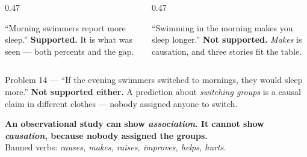 \documentclass[aspectratio=169, 11pt]{beamer}
\newcommand{\redink}[1]{{\color{redacc}\bfseries #1}}
\begin{document}
\begin{frame}[t, plain]
  \vspace{4pt}
  \begin{columns}[t]
    \begin{column}{0.47\textwidth}
      \begin{block}{``Morning swimmers report more sleep.''}
        \redink{Supported.} It is what was seen --- both percents and the gap.
      \end{block}
    \end{column}
    \begin{column}{0.47\textwidth}
      \begin{block}{``Swimming in the morning makes you sleep longer.''}
        \redink{Not supported.} \emph{Makes} is causation, and three stories fit the table.
      \end{block}
    \end{column}
  \end{columns}
  \vspace{8pt}
  \begin{block}{Problem 14 --- ``If the evening swimmers switched to mornings, they would sleep more.''}
    \redink{Not supported either.} A prediction about \emph{switching groups} is a causal claim
    in different clothes --- nobody assigned anyone to switch.
  \end{block}
  \vspace{4pt}
  \begin{center}
    {\color{cerulean}\bfseries An observational study can show \emph{association}. It cannot
    show \emph{causation}, because nobody assigned the groups.}\\[4pt]
    {\small\color{slate} Banned verbs: \emph{causes, makes, raises, improves, helps, hurts.}}
  \end{center}
\end{frame}
\end{document}
